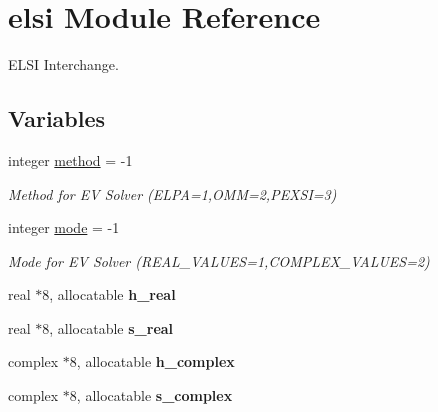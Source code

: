 \hypertarget{namespaceelsi}{}\section{elsi Module Reference}
\label{namespaceelsi}


E\+L\+S\+I Interchange.  


\subsection*{Variables}
\begin{DoxyCompactItemize}
\item 
\hypertarget{namespaceelsi_abb4e04a2d624f8d169abb6dd55f8510c}{}integer \hyperlink{namespaceelsi_abb4e04a2d624f8d169abb6dd55f8510c}{method} = -\/1\label{namespaceelsi_abb4e04a2d624f8d169abb6dd55f8510c}

\begin{DoxyCompactList}\small\item\em Method for E\+V Solver (E\+L\+P\+A=1,O\+M\+M=2,P\+E\+X\+S\+I=3) \end{DoxyCompactList}\item 
\hypertarget{namespaceelsi_ac6c03b44a7776b204d99901393c46f64}{}integer \hyperlink{namespaceelsi_ac6c03b44a7776b204d99901393c46f64}{mode} = -\/1\label{namespaceelsi_ac6c03b44a7776b204d99901393c46f64}

\begin{DoxyCompactList}\small\item\em Mode for E\+V Solver (R\+E\+A\+L\+\_\+\+V\+A\+L\+U\+E\+S=1,C\+O\+M\+P\+L\+E\+X\+\_\+\+V\+A\+L\+U\+E\+S=2) \end{DoxyCompactList}\item 
\hypertarget{namespaceelsi_a25368fc70d64a9f61667dda554a8a9e3}{}real $\ast$8, allocatable {\bfseries h\+\_\+real}\label{namespaceelsi_a25368fc70d64a9f61667dda554a8a9e3}

\item 
\hypertarget{namespaceelsi_a1696b277fa89ac67ccb13bd4297c85f8}{}real $\ast$8, allocatable {\bfseries s\+\_\+real}\label{namespaceelsi_a1696b277fa89ac67ccb13bd4297c85f8}

\item 
\hypertarget{namespaceelsi_a4c6ffe9089d52f797917c58fdfaca93b}{}complex $\ast$8, allocatable {\bfseries h\+\_\+complex}\label{namespaceelsi_a4c6ffe9089d52f797917c58fdfaca93b}

\item 
\hypertarget{namespaceelsi_a6ab74e762816f6c991b972639362513b}{}complex $\ast$8, allocatable {\bfseries s\+\_\+complex}\label{namespaceelsi_a6ab74e762816f6c991b972639362513b}

\end{DoxyCompactItemize}


